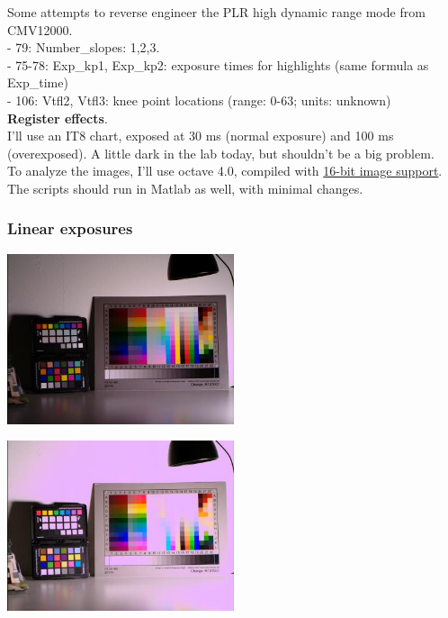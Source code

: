 Some attempts to reverse engineer the PLR high dynamic range mode from CMV12000.\\ 

- 79: Number\_slopes: 1,2,3.\\
- 75-78: Exp\_kp1, Exp\_kp2: exposure times for highlights (same formula as Exp\_time)\\
- 106: Vtfl2, Vtfl3: knee point locations (range: 0-63; units: unknown) \\


\textbf{Register effects}.\\

I'll use an IT8 chart, exposed at 30 ms (normal exposure) and 100 ms (overexposed). A little dark in the lab today, but shouldn't be a big problem.\\

To analyze the images, I'll use octave 4.0, compiled with \href{http://marcelojoeng.blogspot.co.uk/2012/11/compile-octave-using-1632-bits-colour.html}{16-bit image support}. The scripts should run in Matlab as well, with minimal changes.\\

\subsubsection{Linear exposures}

\begin{center}
\includegraphics[height=5cm]{images/30ms-lin}
\end{center}

\begin{center}
\includegraphics[height=5cm]{images/100ms-lin}
\end{center}

